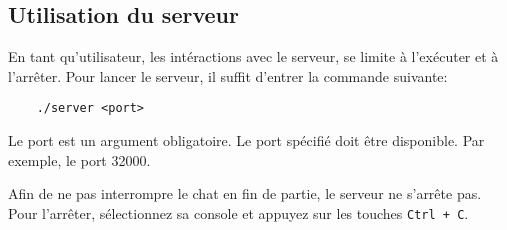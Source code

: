 \subsection{Utilisation du serveur}

En tant qu'utilisateur, les intéractions avec le serveur, se limite à l'exécuter
et à l'arrêter. Pour lancer le serveur, il suffit d'entrer la commande suivante:
\begin{verbatim}
    ./server <port>
\end{verbatim}
Le port est un argument obligatoire. Le port spécifié doit être disponible. Par exemple, le port 32000.

Afin de ne pas interrompre le chat en fin de partie, le serveur ne s'arrête pas. Pour l'arrêter, sélectionnez sa console et appuyez sur les touches \verb|Ctrl + C|.
